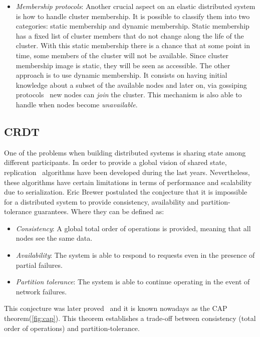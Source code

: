 \begin{itemize}
\item \textit{Membership protocols}: Another crucial aspect on an elastic
  distributed system is how to handle cluster membership. It is possible to
  classify them into two categories: static membership and dynamic membership.
  Static membership has a fixed list of cluster members that do not change along
  the life of the cluster. With this static membership there is a chance that at
  some point in time, some members of the cluster will not be available. Since
  cluster membership image is static, they will be seen as accessible. The other
  approach is to use dynamic membership. It consists on having initial knowledge
  about a subset of the available nodes and later on, via gossiping
  protocols~\cite{gossip} new nodes can \textit{join} the cluster. This mechanism
  is also able to handle when nodes become \textit{unavailable}.
\end{itemize}

\subsection{CRDT}

One of the problems when building distributed systems is sharing state among
different participants. In order to provide a global vision of shared state,
replication~\cite{book:replication} algorithms have been developed during the last
years. Nevertheless, these algorithms have certain limitations in terms of
performance and scalability due to serialization. Eric Brewer postulated the
conjecture that it is impossible for a distributed system to provide
consistency, availability and partition-tolerance guarantees. Where
they can be defined as:

\begin{itemize}
\item \textit{Consistency}: A global total order of operations is provided,
  meaning that all nodes see the same data.
\item \textit{Availability}: The system is able to respond to requests even in
  the presence of partial failures.
\item \textit{Partition tolerance}: The system is able to continue operating in
  the event of network failures.
\end{itemize}

This conjecture was later proved~\cite{capproof} and it is known nowadays as the CAP
theorem(\ref{fig:cap}). This theorem establishes a trade-off between consistency (total order
of operations) and partition-tolerance.

